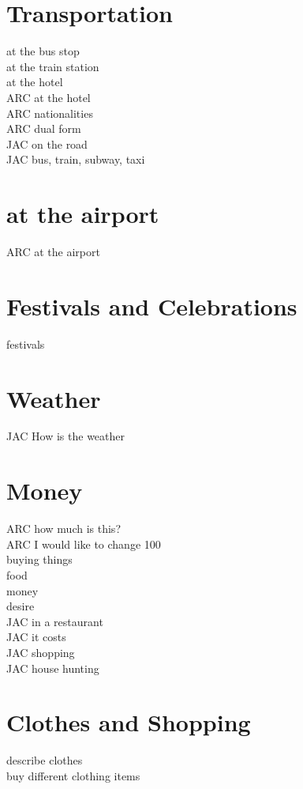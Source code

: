 \chapter{Transportation}
at the bus stop\\
at the train station\\
at the hotel\\
ARC at the hotel\\
ARC nationalities\\
ARC dual form\\
JAC on the road\\
JAC bus, train, subway, taxi\\
\chapter{at the airport}
ARC at the airport\\
\chapter{Festivals and Celebrations}
festivals\\
\chapter{Weather}
JAC How is the weather\\
\chapter{Money}
ARC how much is this?\\
ARC I would like to change 100\\
buying things\\
food\\
money\\
desire\\
JAC in a restaurant\\
JAC it costs\\
JAC shopping\\
JAC house hunting\\
\chapter{Clothes and Shopping}
describe clothes\\
buy different clothing items\\
